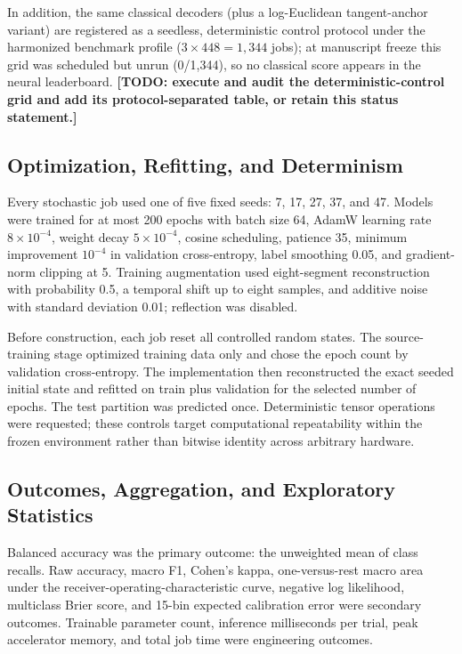 \documentclass[journal,twoside,web]{template/ieeecolor2-tectonic}
\begin{document}
In addition, the same classical decoders (plus a log-Euclidean tangent-anchor variant) are registered as a seedless, deterministic control protocol under the harmonized benchmark profile ($3\times448=1{,}344$ jobs); at manuscript freeze this grid was scheduled but unrun (0/1,344), so no classical score appears in the neural leaderboard. \textbf{[TODO: execute and audit the deterministic-control grid and add its protocol-separated table, or retain this status statement.]}

\subsection{Optimization, Refitting, and Determinism}

Every stochastic job used one of five fixed seeds: 7, 17, 27, 37, and 47. Models were trained for at most 200 epochs with batch size 64, AdamW learning rate $8\times10^{-4}$, weight decay $5\times10^{-4}$, cosine scheduling, patience 35, minimum improvement $10^{-4}$ in validation cross-entropy, label smoothing 0.05, and gradient-norm clipping at 5. Training augmentation used eight-segment reconstruction with probability 0.5, a temporal shift up to eight samples, and additive noise with standard deviation 0.01; reflection was disabled.

Before construction, each job reset all controlled random states. The source-training stage optimized training data only and chose the epoch count by validation cross-entropy. The implementation then reconstructed the exact seeded initial state and refitted on train plus validation for the selected number of epochs. The test partition was predicted once. Deterministic tensor operations were requested; these controls target computational repeatability within the frozen environment rather than bitwise identity across arbitrary hardware.

\subsection{Outcomes, Aggregation, and Exploratory Statistics}

Balanced accuracy was the primary outcome: the unweighted mean of class recalls. Raw accuracy, macro F1, Cohen's kappa, one-versus-rest macro area under the receiver-operating-characteristic curve, negative log likelihood, multiclass Brier score, and 15-bin expected calibration error were secondary outcomes. Trainable parameter count, inference milliseconds per trial, peak accelerator memory, and total job time were engineering outcomes.
\end{document}
